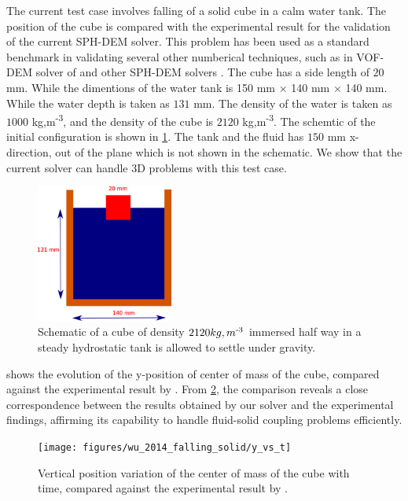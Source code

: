 \documentclass[preprint,12pt]{elsarticle}
\begin{document}
The current test case involves falling of a solid cube in a calm water
tank. The position of the cube is compared with the
experimental\cite{wu2014two} result for the validation of the current SPH-DEM
solver. This problem has been used as a standard benchmark in validating
several other numberical techniques, such as in VOF-DEM solver of
\cite{nan2022cfd} and other SPH-DEM solvers \cite{qiu20173d}. The cube has a
side length of $20$ mm. While the dimentions of the water tank is 150 mm
$\times$ 140 mm $\times$ 140 mm. While the water depth is taken as $131$ mm. The density
of the water is taken as $1000$ kg,m\textsuperscript{-3}, and the density of
the cube is $2120$ kg,m\textsuperscript{-3}. The schemtic of the initial
configuration is shown in \cref{fig:results_rfc_02_falling}. The tank and the
fluid has $150$ mm x-direction, out of the plane which is not shown in the
schematic. We show that the current solver can handle 3D problems with this
test case.
\begin{figure}[!htpb]
  \centering
  \includegraphics[width=0.4\textwidth]{images/rfc_02_falling_solid_in_water/schematic}
  \caption{Schematic of a cube of density $2120 kg,m\textsuperscript{-3}$
    immersed half way in a steady hydrostatic tank is allowed to settle under
    gravity.}
  \label{fig:results_rfc_02_falling}
\end{figure}



 shows the evolution of the y-position of
center of mass of the cube, compared against the experimental result by
\citet{wu2014two}. From \cref{fig:results_rfc_02_y_vs_t}, the comparison
reveals a close correspondence between the results obtained by our solver and
the experimental findings, affirming its capability to handle fluid-solid
coupling problems efficiently.
\begin{figure}[!htpb]
  \centering
  \texttt{[image: figures/wu\_2014\_falling\_solid/y\_vs\_t]}
  \caption{Vertical position variation of the center of mass of the cube with
    time, compared against the experimental result by \citet{wu2014two}.}
  \label{fig:results_rfc_02_y_vs_t}
\end{figure}
\end{document}
